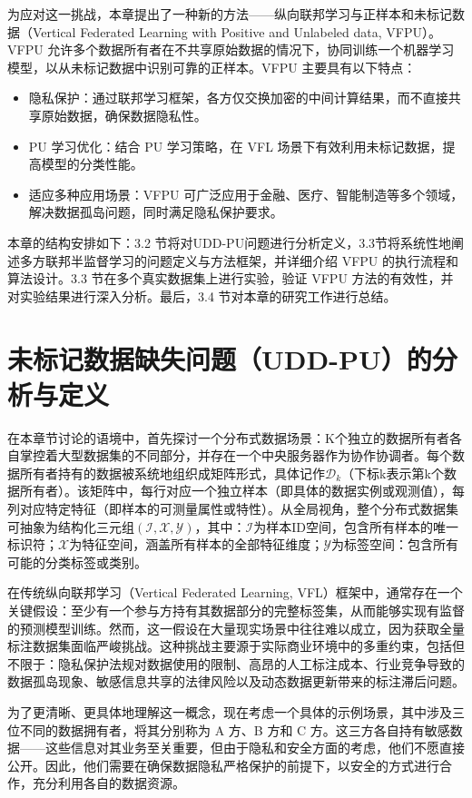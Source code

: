 为应对这一挑战，本章提出了一种新的方法——纵向联邦学习与正样本和未标记数据（Vertical Federated Learning with Positive and Unlabeled data, VFPU）。VFPU 允许多个数据所有者在不共享原始数据的情况下，协同训练一个机器学习模型，以从未标记数据中识别可靠的正样本。VFPU 主要具有以下特点：
\begin{itemize}
	\item 隐私保护：通过联邦学习框架，各方仅交换加密的中间计算结果，而不直接共享原始数据，确保数据隐私性。
	\item PU 学习优化：结合 PU 学习策略，在 VFL 场景下有效利用未标记数据，提高模型的分类性能。
	\item 适应多种应用场景：VFPU 可广泛应用于金融、医疗、智能制造等多个领域，解决数据孤岛问题，同时满足隐私保护要求。
\end{itemize}
本章的结构安排如下：3.2 节将对UDD-PU问题进行分析定义，3.3节将系统性地阐述多方联邦半监督学习的问题定义与方法框架，并详细介绍 VFPU 的执行流程和算法设计。3.3 节在多个真实数据集上进行实验，验证 VFPU 方法的有效性，并对实验结果进行深入分析。最后，3.4 节对本章的研究工作进行总结。



\section{未标记数据缺失问题（UDD-PU）的分析与定义}
在本章节讨论的语境中，首先探讨一个分布式数据场景：K个独立的数据所有者各自掌控着大型数据集的不同部分，并存在一个中央服务器作为协作协调者。每个数据所有者持有的数据被系统地组织成矩阵形式，具体记作${{\mathsf{\mathcal{D}}}_{k}}$（下标k表示第k个数据所有者）。该矩阵中，每行对应一个独立样本（即具体的数据实例或观测值），每列对应特定特征（即样本的可测量属性或特性）。从全局视角，整个分布式数据集可抽象为结构化三元组$(\mathsf{\mathcal{I}}, \mathsf{\mathcal{X}}, \mathsf{\mathcal{Y}})$，其中：$\mathsf{\mathcal{I}}$为样本ID空间，包含所有样本的唯一标识符；$\mathsf{\mathcal{X}}$为特征空间，涵盖所有样本的全部特征维度；$\mathsf{\mathcal{Y}}$为标签空间：包含所有可能的分类标签或类别。

在传统纵向联邦学习（Vertical Federated Learning, VFL）框架中，通常存在一个关键假设：至少有一个参与方持有其数据部分的完整标签集，从而能够实现有监督的预测模型训练。然而，这一假设在大量现实场景中往往难以成立，因为获取全量标注数据集面临严峻挑战。这种挑战主要源于实际商业环境中的多重约束，包括但不限于：隐私保护法规对数据使用的限制、高昂的人工标注成本、行业竞争导致的数据孤岛现象、敏感信息共享的法律风险以及动态数据更新带来的标注滞后问题。

为了更清晰、更具体地理解这一概念，现在考虑一个具体的示例场景，其中涉及三位不同的数据拥有者，将其分别称为 A 方、B 方和 C 方。这三方各自持有敏感数据——这些信息对其业务至关重要，但由于隐私和安全方面的考虑，他们不愿直接公开。因此，他们需要在确保数据隐私严格保护的前提下，以安全的方式进行合作，充分利用各自的数据资源。

